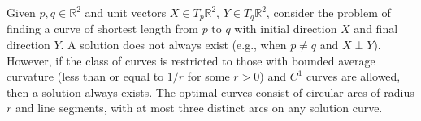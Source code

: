 Given $p, q \in \mathbb{R}^2$ and unit vectors $X \in T_p\mathbb{R}^2$, $Y \in T_q\mathbb{R}^2$, consider the problem of finding a curve of shortest length from $p$ to $q$ with initial direction $X$ and final direction $Y$. A solution does not always exist (e.g., when $p \neq q$ and $X \perp Y$). However, if the class of curves is restricted to those with bounded average curvature (less than or equal to $1/r$ for some $r > 0$) and $C^1$ curves are allowed, then a solution always exists. The optimal curves consist of circular arcs of radius $r$ and line segments, with at most three distinct arcs on any solution curve.
